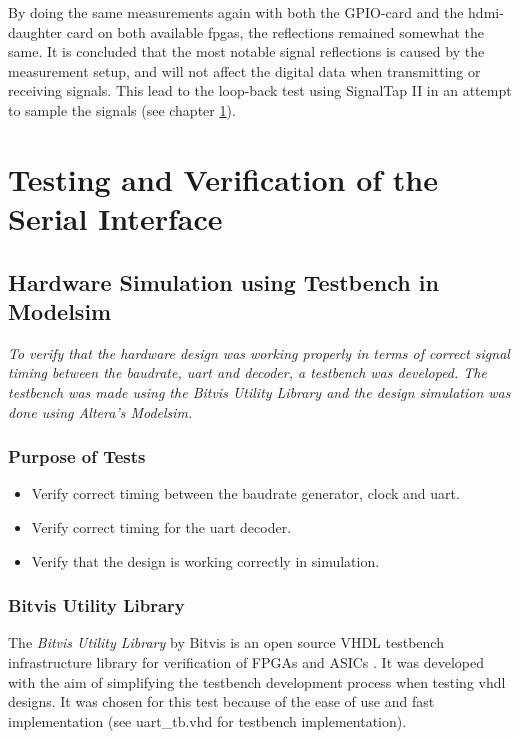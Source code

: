 \documentclass[main.tex]{subfiles}
\begin{document}
By doing the same measurements again with both the GPIO-card and the \gls{hdmi}-daughter card on both available \glspl{fpga}, the reflections remained somewhat the same. It is concluded that the most notable signal reflections is caused by the measurement setup, and will not affect the digital data when transmitting or receiving signals. This lead to the loop-back test using SignalTap II in an attempt to sample the signals (see chapter \ref{chap:sertest}).

\section{Testing and Verification of the Serial Interface} \label{chap:sertest}

\subsection{Hardware Simulation using Testbench in Modelsim}

\textit{To verify that the hardware design was working properly in terms of correct signal timing between the baudrate, \acrshort{uart} and decoder, a testbench was developed. The testbench was made using the \textit{Bitvis Utility Library} and the design simulation was done using Altera's Modelsim.}

\subsubsection{Purpose of Tests}

\begin{itemize}\setlength{\itemsep}{10pt}
\item Verify correct timing between the baudrate generator, clock and uart.
\item Verify correct timing for the uart decoder.
\item Verify that the design is working correctly in simulation.
\end{itemize}

\subsubsection{Bitvis Utility Library}
The \textit{Bitvis Utility Library} by Bitvis is an open source VHDL testbench infrastructure library for verification of FPGAs and ASICs \cite{bitvis16}. It was developed with the aim of simplifying the testbench development process when testing \acrshort{vhdl} designs. It was chosen for this test because of the ease of use and fast implementation (see uart\_tb.vhd for testbench implementation).\\
\end{document}
